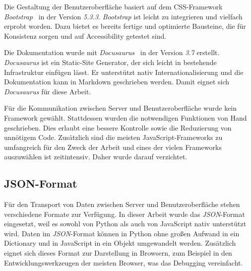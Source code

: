 Die Gestaltung der Benutzeroberfläche basiert auf dem CSS-Framework \textit{Bootstrap}~\cite{bootstrap} in der Version \textit{5.3.3}.
\textit{Bootstrap} ist leicht zu integrieren und vielfach erprobt worden. Dazu bietet es bereits fertige und optimierte Bausteine, die für Konsistenz sorgen und auf Accessibility getestet sind.


Die Dokumentation wurde mit \textit{Docusaurus}~\cite{docusaurus} in der Version \textit{3.7} erstellt. \textit{Docusaurus} ist ein Static-Site Generator, der sich leicht in
bestehende Infrastruktur einfügen lässt. Er unterstützt nativ Internationalisierung und die Dokumentation kann in Markdown geschrieben werden. Damit eignet sich \textit{Docusaurus} für diese Arbeit.

Für die Kommunikation zwischen Server und Benutzeroberfläche wurde kein Framework gewählt. Stattdessen wurden die notwendigen Funktionen von Hand geschrieben. Dies erlaubt eine bessere Kontrolle sowie die
Reduzierung von unnötigem Code. Zusätzlich sind die meisten JavaScript-Frameworks zu umfangreich für den Zweck der Arbeit und eines der vielen Frameworks auszuwählen ist zeitintensiv. Daher wurde darauf verzichtet.

\subsection{JSON-Format}

Für den Transport von Daten zwischen Server und Benutzeroberfläche stehen verschiedene Formate zur Verfügung. In dieser Arbeit wurde das \textit{JSON}-Format eingesetzt,
weil es sowohl von Python als auch von JavaScript nativ unterstützt wird. Daten im \textit{JSON}-Format können in Python ohne großen Aufwand in ein Dictionary und in JavaScript in ein Objekt umgewandelt werden.
Zusätzlich eignet sich dieses Format zur Darstellung in Browsern, zum Beispiel in den Entwicklungswerkzeugen der meisten Browser, was das Debugging vereinfacht.

